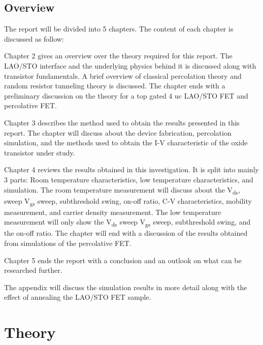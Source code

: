 \documentclass[11pt,a4paper]{report}
\begin{document}
\newpage

\section{Overview}
The report will be divided into 5 chapters. The content of each chapter is discussed as follow:

Chapter 2 gives an overview over the theory required for this report. The LAO/STO interface and the underlying physics behind it is discussed along with transistor fundamentals. A brief overview of classical percolation theory and random resistor tunneling theory is discussed. The chapter ends with a preliminary discussion on the theory for a top gated 4 uc LAO/STO FET and percolative FET.

Chapter 3 describes the method used to obtain the results presented in this report. The chapter will discuss about the device fabrication, percolation simulation, and the methods used to obtain the I-V characteristic of the oxide transistor under study. 

Chapter 4 reviews the results obtained in this investigation. It is split into mainly 3 parts: Room temperature characteristics, low temperature characteristics, and simulation. The room temperature measurement will discuss about the V\textsubscript{ds}, sweep V\textsubscript{gs} sweep, subthreshold swing, on-off ratio, C-V characteristics, mobility measurement, and carrier density measurement. The low temperature measurement will only show the  V\textsubscript{ds} sweep V\textsubscript{gs} sweep, subthreshold swing, and the on-off ratio. The chapter will end with a discussion of the results obtained from simulations of the percolative FET.

Chapter 5 ends the report with a conclusion and an outlook on what can be researched further.

The appendix will discuss the simulation results in more detail along with the effect of annealing the LAO/STO FET sample.


\chapter{Theory}

\end{document}
